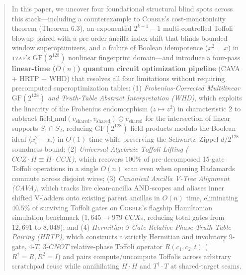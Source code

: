 \documentclass[11pt,a4paper]{article}
\theoremstyle{definition}
\begin{document}
\begin{abstract}
In this paper, we uncover four foundational structural blind spots across this stack---including a counterexample to \textsc{Cobble}'s cost-monotonicity theorem (Theorem 6.3), an exponential $2^{k-1}-1$ multi-controlled Toffoli blowup paired with a pre-order ancilla index shift that blinds bounded-window superoptimizers, and a failure of Boolean idempotence ($x^2 = x$) in \textsc{tzap}'s $\mathrm{GF}(2^{128})$ nonlinear fingerprint domain---and introduce a four-pass \textbf{linear-time ($O(n)$) quantum circuit optimization pipeline} (\textsc{CAVA} + \textsc{HRTP} + \textsc{WHD}) that resolves all four limitations without requiring precomputed superoptimization tables:
(1) \emph{Frobenius-Corrected Multilinear $\mathrm{GF}(2^{128})$ and Truth-Table Abstract Interpretation (\textsc{WHD})}, which exploits the linearity of the Frobenius endomorphism ($z \mapsto z^2$) in characteristic $2$ to subtract $\mathrm{field\_mul}(v_{\mathrm{shared}}, v_{\mathrm{shared}}) \oplus v_{\mathrm{shared}}$ for the intersection of linear supports $S_1 \cap S_2$, reducing $\mathrm{GF}(2^{128})$ field products modulo the Boolean ideal $\langle x_i^2 - x_i \rangle$ in $O(1)$ time while preserving the Schwartz--Zippel $d/2^{128}$ soundness bound;
(2) \emph{Universal Algebraic Toffoli Lifting ($\mathit{CCZ}\cdot H \equiv H\cdot \mathit{CCX}$)}, which recovers $100\%$ of pre-decomposed 15-gate Toffoli operations in a single $O(n)$ scan even when opening Hadamards commute across disjoint wires;
(3) \emph{Canonical Ancilla V-Tree Alignment (\textsc{CAVA})}, which tracks live clean-ancilla AND-scopes and aliases inner shifted V-ladders onto existing parent ancillas in $O(n)$ time, eliminating $40.5\%$ of surviving Toffoli gates on \textsc{Cobble}'s flagship Hamiltonian simulation benchmark ($1{,}645 \to 979$ $\mathit{CCX}$s, reducing total gates from $12{,}691$ to $8{,}048$); and
(4) \emph{Hermitian 9-Gate Relative-Phase Truth-Table Pairing (\textsc{HRTP})}, which constructs a strictly Hermitian and involutory 9-gate, 4-$T$, 3-$\mathit{CNOT}$ relative-phase Toffoli operator $R(c_1, c_2, t)$ ($R^\dagger = R, R^2 = I$) and pairs compute/uncompute Toffolis across arbitrary scratchpad reuse while annihilating $H\cdot H$ and $T^\dagger\cdot T$ at shared-target seams.


\end{abstract}
\end{document}
